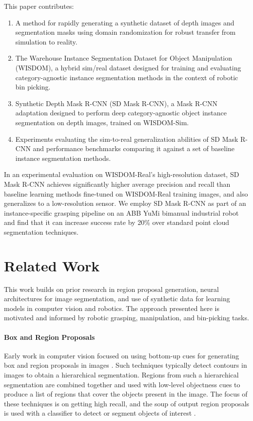 \documentclass[letterpaper, 10 pt, conference]{ieeeconf}  \pdfoutput=1
\numberwithin{equation}{section}
\begin{document}
This paper contributes:
\begin{enumerate}
   \item A method for rapidly generating a synthetic dataset of depth images and segmentation masks using domain randomization for robust transfer from simulation to reality.
   \item The Warehouse Instance Segmentation Dataset for Object Manipulation (WISDOM), a hybrid sim/real dataset designed for training and evaluating category-agnostic instance segmentation methods in the context of robotic bin picking.
   \item Synthetic Depth Mask R-CNN (SD Mask R-CNN), a Mask R-CNN adaptation designed to perform deep category-agnostic object instance segmentation on depth images, trained on WISDOM-Sim.
   \item Experiments evaluating the  sim-to-real generalization abilities of SD Mask R-CNN and performance benchmarks comparing it against a set of baseline instance segmentation methods.
\end{enumerate}

In an experimental evaluation on WISDOM-Real's high-resolution dataset, SD Mask R-CNN achieves significantly higher average precision and recall than baseline learning methods fine-tuned on WISDOM-Real training images, and also generalizes to a low-resolution sensor. We employ SD Mask R-CNN as part of an instance-specific grasping pipeline on an ABB YuMi bimanual industrial robot and find that it can increase success rate by 20\% over standard point cloud segmentation techniques.









 \section{Related Work}

This work builds on prior research in region proposal generation, 
neural architectures for image segmentation, and use of synthetic data 
for learning models in computer vision and robotics. The approach presented 
here is motivated and informed by robotic grasping, manipulation, and bin-picking tasks.

\paragraph{Box and Region Proposals} 
Early work in computer vision focused on using bottom-up cues for
generating box and region proposals in images \cite{arbelaez2014multiscale, krahenbuhl2014geodesic,alexe2012measuring, endres2010category, van2011segmentation}. 
Such techniques typically detect contours in images to obtain a hierarchical segmentation.
Regions from such a hierarchical segmentation are combined together and
used with low-level objectness cues to produce a list of regions that cover the 
objects present in the image. The focus of these techniques is on getting high recall, and 
the soup of output region proposals is used with a classifier to detect or segment
objects of interest \cite{carreira2012semantic}.
\end{document}
